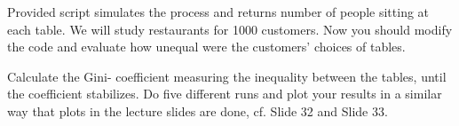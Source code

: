 \documentclass{WeSTassignment}
\begin{document}
Provided script simulates the process and returns number of people sitting at each table. We will study restaurants for 1000 customers.
Now you should modify the code and evaluate how unequal were the customers' choices of tables.   



Calculate the Gini-
coefficient measuring the inequality between the tables,
until the coefficient stabilizes. Do five different runs and plot your results in a similar way that plots in the lecture slides are done, cf. Slide 32 and Slide 33.
\end{document}
